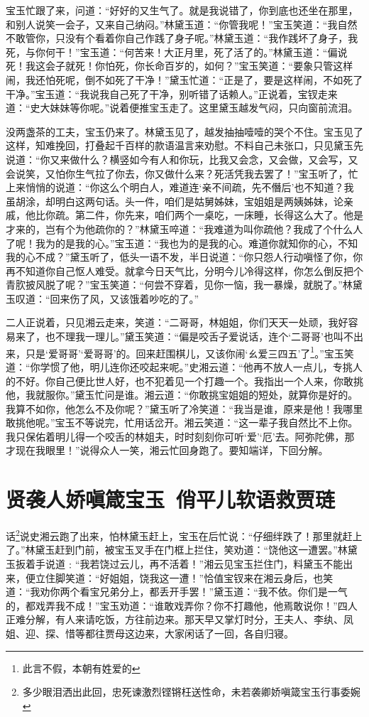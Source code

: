 \documentclass[12pt,oneside]{book}
\begin{document}
宝玉忙跟了来，问道：“好好的又生气了。就是我说错了，你到底也还坐在那里，和别人说笑一会子，又来自己纳闷。”林黛玉道：“你管我呢！”宝玉笑道：“我自然不敢管你，只没有个看着你自己作践了身子呢。”林黛玉道：“我作践坏了身子，我死，与你何干！”宝玉道：“何苦来！大正月里，死了活了的。”林黛玉道：“偏说死！我这会子就死！你怕死，你长命百岁的，如何？”宝玉笑道：“要象只管这样闹，我还怕死呢，倒不如死了干净！”黛玉忙道：“正是了，要是这样闹，不如死了干净。”宝玉道：“我说我自己死了干净，别听错了话赖人。”正说着，宝钗走来道：“史大妹妹等你呢。”说着便推宝玉走了。这里黛玉越发气闷，只向窗前流泪。

没两盏茶的工夫，宝玉仍来了。林黛玉见了，越发抽抽噎噎的哭个不住。宝玉见了这样，知难挽回，打叠起千百样的款语温言来劝慰。不料自己未张口，只见黛玉先说道：“你又来做什么？横竖如今有人和你玩，比我又会念，又会做，又会写，又会说笑，又怕你生气拉了你去，你又做什么来？死活凭我去罢了！”宝玉听了，忙上来悄悄的说道：“你这么个明白人，难道连‘亲不间疏，先不僭后’也不知道？我虽胡涂，却明白这两句话。头一件，咱们是姑舅姊妹，宝姐姐是两姨姊妹，论亲戚，他比你疏。第二件，你先来，咱们两个一桌吃，一床睡，长得这么大了。他是才来的，岂有个为他疏你的？”林黛玉啐道：“我难道为叫你疏他？我成了个什么人了呢！我为的是我的心。”宝玉道：“我也为的是我的心。难道你就知你的心，不知我的心不成？”黛玉听了，低头一语不发，半日说道：“你只怨人行动嗔怪了你，你再不知道你自己怄人难受。就拿今日天气比，分明今儿冷得这样，你怎么倒反把个青肷披风脱了呢？”宝玉笑道：“何尝不穿着，见你一恼，我一暴燥，就脱了。”林黛玉叹道：“回来伤了风，又该饿着吵吃的了。”

二人正说着，只见湘云走来，笑道：“二哥哥，林姐姐，你们天天一处顽，我好容易来了，也不理我一理儿。”黛玉笑道：“偏是咬舌子爱说话，连个‘二哥哥’也叫不出来，只是‘爱哥哥’‘爱哥哥’的。回来赶围棋儿，又该你闹‘ㄠ爱三四五’了\footnote{此言不假，本朝有姓爱的}。”宝玉笑道：“你学惯了他，明儿连你还咬起来呢。”史湘云道：“他再不放人一点儿，专挑人的不好。你自己便比世人好，也不犯着见一个打趣一个。我指出一个人来，你敢挑他，我就服你。”黛玉忙问是谁。湘云道：“你敢挑宝姐姐的短处，就算你是好的。我算不如你，他怎么不及你呢？”黛玉听了冷笑道：“我当是谁，原来是他！我哪里敢挑他呢。”宝玉不等说完，忙用话岔开。湘云笑道：“这一辈子我自然比不上你。我只保佑着明儿得一个咬舌的林姐夫，时时刻刻你可听‘爱’‘厄’去。阿弥陀佛，那才现在我眼里！”说得众人一笑，湘云忙回身跑了。要知端详，下回分解。

 
 
\chapter{贤袭人娇嗔箴宝玉~俏平儿软语救贾琏}
话\footnote{多少眼泪洒出此回，忠死谏激烈铿锵枉送性命，未若袭卿娇嗔箴宝玉行事委婉}说史湘云跑了出来，怕林黛玉赶上，宝玉在后忙说：“仔细绊跌了！那里就赶上了。”林黛玉赶到门前，被宝玉叉手在门框上拦住，笑劝道：“饶他这一遭罢。”林黛玉扳着手说道﹕“我若饶过云儿，再不活着！”湘云见宝玉拦住门，料黛玉不能出来，便立住脚笑道：“好姐姐，饶我这一遭！”恰值宝钗来在湘云身后，也笑道：“我劝你两个看宝兄弟分上，都丢开手罢！”黛玉道：“我不依。你们是一气的，都戏弄我不成！”宝玉劝道：“谁敢戏弄你？你不打趣他，他焉敢说你！”四人正难分解，有人来请吃饭，方往前边来。那天早又掌灯时分，王夫人、李纨、凤姐、迎、探、惜等都往贾母这边来，大家闲话了一回，各自归寝。
\end{document}
